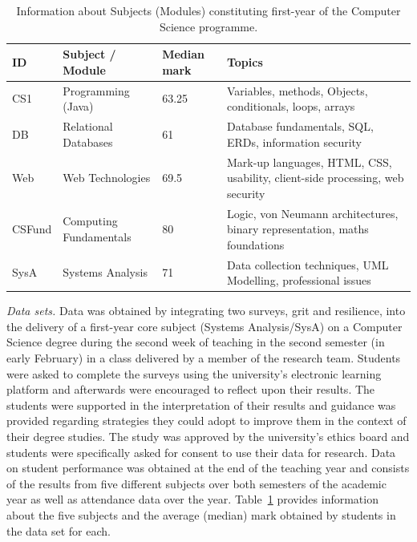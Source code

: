 \documentclass[sigconf]{acmart}
\begin{document}
\begin{table}[ht]
\caption{Information about Subjects (Modules) constituting first-year of the Computer Science programme.}
\begin{tabular}{llll}
\hline
\textbf{ID} & \textbf{Subject / Module} & \textbf{Median mark} & \textbf{Topics} \\
\hline
CS1  & Programming (Java)         & 63.25        & Variables, methods, Objects, conditionals, loops, arrays          \\
DB  & Relational Databases       & 61        & Database fundamentals, SQL, ERDs, information security          \\
Web  & Web Technologies         & 69.5      & Mark-up languages, HTML, CSS, usability, client-side processing, web security          \\
CSFund  & Computing Fundamentals & 80        & Logic, von Neumann architectures, binary representation, maths foundations          \\
SysA  & Systems Analysis        & 71        & Data collection techniques, UML Modelling, professional issues                 
\end{tabular}
\label{tab:module_info}
\end{table}

{\em Data sets.}
Data was obtained by integrating two surveys, grit and resilience, into the delivery of a first-year core subject (Systems Analysis/SysA) on a Computer Science degree during the second week of teaching in the second semester (in early February) in a class delivered by a member of the research team. Students were asked to complete the surveys using the university's electronic learning platform and afterwards were encouraged to reflect upon their results. The students were supported in the interpretation of their results and guidance was provided regarding strategies they could adopt to improve them in the context of their degree studies. The study was approved by the university's ethics board and students were specifically asked for consent to use their data for research. Data on student performance was obtained at the end of the teaching year and consists of the results from five different subjects over both semesters of the academic year as well as attendance data over the year. Table~\ref{tab:module_info} provides information about the five subjects and the average (median) mark obtained by students in the data set for each.
\end{document}
